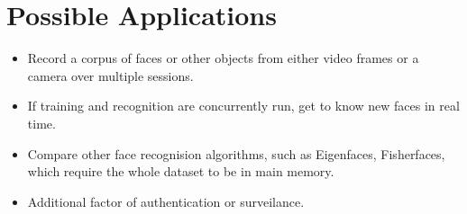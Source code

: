 \documentclass{article}
\begin{document}
\section{Possible Applications}
\begin{itemize}
    \item{Record a corpus of faces or other objects from either video frames or a camera over multiple sessions.}
    \item{If training and recognition are concurrently run, get to know new faces in real time.}
    \item{Compare other face recognision algorithms, such as Eigenfaces, Fisherfaces, which require the whole dataset to be in main memory.}
    \item{Additional factor of authentication or surveilance.}
\end{itemize}


\printbibliography
\end{document}

